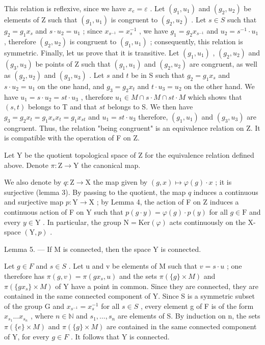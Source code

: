 This relation is reflexive, since we have \(x_e = \varepsilon\) . Let \((g_1, u_1)\) and \((g_2, u_2)\) be elements of Z such that \((g_1, u_1)\) is congruent to \((g_2, u_2)\) . Let \(s \in S\) such that \(g_2 = g_1 x_s\) and \(s \cdot u_2 = u_1\) ; since \(x_{s^{-1}} = x_s^{-1}\) , we have \(g_1 = g_2 x_{s^{-1}}\) and \(u_2 = s^{-1} \cdot u_1\) , therefore \((g_2, u_2)\) is congruent to \((g_1, u_1)\) ; consequently, this relation is symmetric. Finally, let us prove that it is transitive. Let \((g_1, u_1)\) , \((g_2, u_2)\) and \((g_3, u_3)\) be points of Z such that \((g_1, u_1)\) and \((g_2, u_2)\) are congruent, as well as \((g_2, u_2)\) and \((g_3, u_3)\) . Let \(s\) and \(t\) be in S such that \(g_2 = g_1 x_s\) and \(s \cdot u_2 = u_1\) on the one hand, and \(g_3 = g_2 x_t\) and \(t \cdot u_3 = u_2\) on the other hand. We have \(u_1 = s \cdot u_2 = st \cdot u_3\) , therefore \(u_1 \in M \cap s \cdot M \cap st \cdot M\) which shows that \((s, t)\) belongs to T and that \(st\) belongs to S. We then have \(g_3 = g_2 x_t = g_1 x_s x_t = g_1 x_{st}\) and \(u_1 = st \cdot u_3\) therefore, \((g_1, u_1)\) and \((g_3, u_3)\) are congruent. Thus, the relation "being congruent" is an equivalence relation on Z. It is compatible with the operation of F on Z.

Let Y be the quotient topological space of Z for the equivalence relation defined above. Denote \(\pi\colon\mathrm{Z}\to\mathrm{Y}\) the canonical map.

We also denote by \(q \colon \mathrm{Z} \to \mathrm{X}\) the map given by \((g, x) \mapsto \varphi(g) \cdot x\) ; it is surjective (lemma 3). By passing to the quotient, the map \(q\) induces a continuous and surjective map \(p \colon \mathrm{Y} \to \mathrm{X}\) ; by Lemma 4, the action of F on Z induces a continuous action of F on Y such that \(p(g \cdot y) = \varphi(g) \cdot p(y)\) for all \(g \in \mathrm{F}\) and every \(y \in \mathrm{Y}\) . In particular, the group \(\mathrm{N} = \mathrm{Ker}(\varphi)\) acts continuously on the X-space \((\mathrm{Y}, p)\) .

Lemma 5. --- If M is connected, then the space Y is connected.

Let \(g \in F\) and \(s \in S\) . Let u and v be elements of M such that \(v = s \cdot u\) ; one therefore has \(\pi(g, v) = \pi(gx_s, u)\) and the sets \(\pi(\{g\} \times M)\) and \(\pi(\{gx_s\} \times M)\) of Y have a point in common. Since they are connected, they are contained in the same connected component of Y. Since S is a symmetric subset of the group G and \(x_{s^{-1}} = x_s^{-1}\) for all \(s \in S\) , every element g of F is of the form \(x_{s_1} \ldots x_{s_n}\) , where \(n \in \mathbb{N}\) and \(s_1, \ldots, s_n\) are elements of S. By induction on n, the sets \(\pi(\{e\} \times M)\) and \(\pi(\{g\} \times M)\) are contained in the same connected component of Y, for every \(g \in F\) . It follows that Y is connected.

